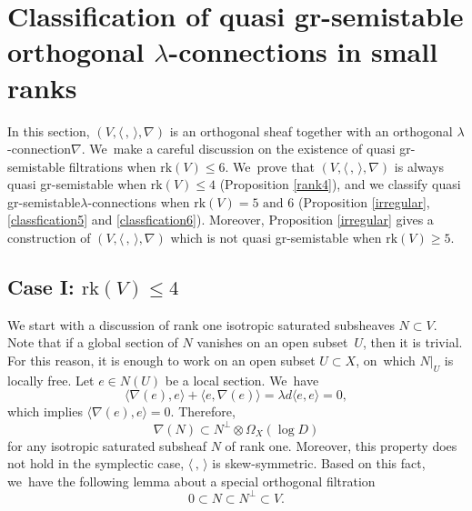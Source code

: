\documentclass[JEP,XML,SOM,Unicode,published]{cedram}
\newcommand{\lconnection}{$\lambda$\nobreakdash-con\-nec\-tion\xspace}
\newcommand{\lconnections}{$\lambda$\nobreakdash-con\-nec\-tions\xspace}
\newcommand{\grsemistable}{gr\nobreakdash-semi\-stable\xspace}
\newcommand{\rk}{\mathrm{rk}}
\theoremstyle{plain}
\theoremstyle{definition}
\begin{document}
\section{Classification of quasi \texorpdfstring{\protect\grsemistable}{grsemistable} orthogonal \texorpdfstring{\protect\lconnections}{lconnections} in small ranks}\label{sect_small_rank}

In this section, $(V, \langle \,, \, \rangle, \nabla)$ is an orthogonal sheaf together with an orthogonal \lconnection $\nabla$. We~make a careful discussion on the existence of quasi \grsemistable filtrations when $\rk (V) \leq 6$. We~prove that $(V, \langle \,, \, \rangle, \nabla)$ is always quasi \grsemistable when $\rk(V) \leq 4$ (Proposition \ref{rank4}), and we classify quasi \grsemistable \lconnections when $\rk(V) = 5 \text{ and }6$ (Proposition \ref{irregular}, \ref{classfication5} and \ref{classfication6}). Moreover, Proposition \ref{irregular} gives a construction of $(V, \langle \,, \, \rangle, \nabla)$ which is not quasi \grsemistable when $\rk(V) \geq 5$.

\subsection{Case I: ${\rk(V) \leq 4}$}
We start with a discussion of rank one isotropic saturated subsheaves $N\subset V$. Note that if a global section of $N$ vanishes on an open subset~$U$, then it is trivial. For this reason, it is enough to work on an open subset $U \subset X$, on~which $N|_U$ is locally free. Let $e \in N(U)$ be a local section. We~have
\[
\langle \nabla(e),e \rangle+\langle e,\nabla(e) \rangle=\lambda d\langle e,e \rangle=0,
\]
which implies $\langle \nabla(e),e \rangle=0$. Therefore,
\[
\nabla(N)\subset N^\perp\otimes\Omega_X(\log D)
\]
for any isotropic saturated subsheaf $N$ of rank one. Moreover, this property does not hold in the symplectic case, \ie $\langle \,, \, \rangle$ is skew-symmetric. Based on this fact, we~have the following lemma about a special orthogonal filtration
\[
0\subset N\subset N^\perp\subset V.
\] 
\end{document}
